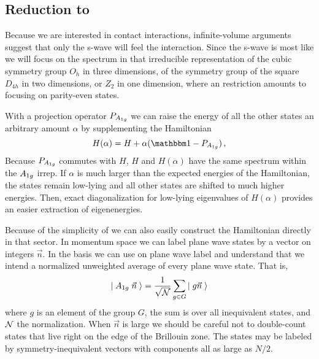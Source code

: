 \subsection{Reduction to \Aoneg}

Because we are interested in contact interactions, infinite-volume arguments suggest that only the s-wave will feel the interaction.
Since the s-wave is most like \Aoneg we will focus on the spectrum in that irreducible representation of the cubic symmetry group $O_h$ in three dimensions, of the symmetry group of the square $D_{4h}$ in two dimensions, or $Z_2$ in one dimension, where an \Aoneg restriction amounts to focusing on parity-even states.

With a projection operator $P_{A_{1g}}$ we can raise the energy of all the other states an arbitrary amount $\alpha$ by supplementing the Hamiltonian
\begin{equation}
    H(\alpha) = H + \alpha (\one - P_{\Aoneg}) \, ,
\end{equation}
Because $P_{A_{1g}}$ commutes with $H$, $H$ and $H(\alpha)$ have the same spectrum within the $A_{1g}$ irrep.
If $\alpha$ is much larger than the expected energies of the Hamiltonian, the \Aoneg states remain low-lying and all other states are shifted to much higher energies.
Then, exact diagonalization for low-lying eigenvalues of $H(\alpha)$ provides an easier extraction of \Aoneg eigenenergies.

Because of the simplicity of \Aoneg we can also easily construct the Hamiltonian directly in that sector.
In momentum space we can label plane wave states by a vector on integers $\vec{n}$.
In the \Aoneg basis we can use on plane wave label and understand that we intend a normalized unweighted average of every plane wave state.
That is,
\begin{equation}
    \left|\;A_{1g}\; \vec{n}\;\right\rangle = \frac{1}{\sqrt{\mathcal{N}}} \sum_{g \in G} \left|\; g\vec{n}\;\right\rangle
\end{equation}
where $g$ is an element of the group $G$, the sum is over all inequivalent states, and $\mathcal{N}$ the normalization.
When $\vec{n}$ is large we should be careful not to double-count states that live right on the edge of the Brillouin zone.
The states may be labeled by symmetry-inequivalent vectors with components all as large as $N/2$.

